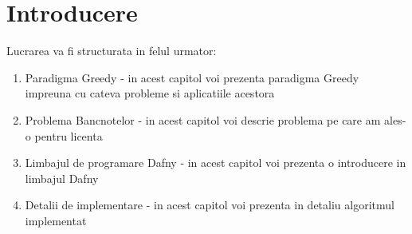 \chapter*{Introducere} 

Lucrarea va fi structurata in felul urmator: 
\begin{enumerate}
	\item Paradigma Greedy - in acest capitol voi prezenta paradigma Greedy impreuna cu cateva probleme si aplicatiile acestora
	\item Problema Bancnotelor - in acest capitol voi descrie problema pe care am ales-o pentru licenta
	\item Limbajul de programare Dafny - in acest capitol voi prezenta o introducere in limbajul Dafny
	\item Detalii de implementare - in acest capitol voi prezenta in detaliu algoritmul implementat
\end{enumerate}